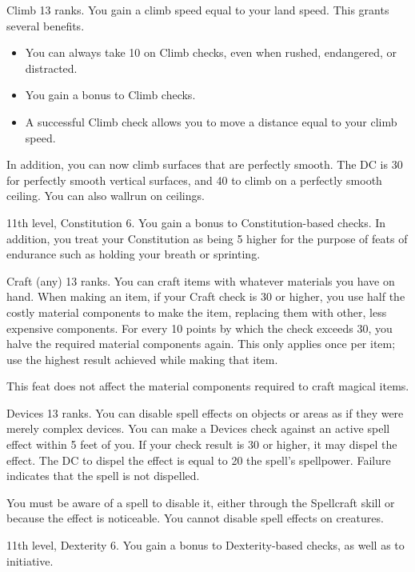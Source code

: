 \featpre Climb 13 ranks.
\featben You gain a climb speed equal to your land speed.
This grants several benefits.
\begin{itemize}
    \item You can always take 10 on Climb checks, even when rushed, endangered, or distracted.
    \item You gain a  bonus to Climb checks.
    \item A successful Climb check allows you to move a distance equal to your climb speed.
\end{itemize}

In addition, you can now climb surfaces that are perfectly smooth.
The DC is 30 for perfectly smooth vertical surfaces, and 40 to climb on a perfectly smooth ceiling.
You can also wallrun on ceilings.

\featpres 11th level, Constitution 6.
\featben You gain a  bonus to Constitution-based checks.
In addition, you treat your Constitution as being 5 higher for the purpose of feats of endurance such as holding your breath or sprinting.

\featpre Craft (any) 13 ranks.
\featben You can craft items with whatever materials you have on hand.
When making an item, if your Craft check is 30 or higher, you use half the costly material components to make the item, replacing them with other, less expensive components.
For every 10 points by which the check exceeds 30, you halve the required material components again.
This only applies once per item; use the highest result achieved while making that item.

This feat does not affect the material components required to craft magical items.

\featpre Devices 13 ranks.
\featben You can disable spell effects on objects or areas as if they were merely complex devices.
You can make a Devices check against an active spell effect within 5 feet of you.
If your check result is 30 or higher, it may dispel the effect.
The DC to dispel the effect is equal to 20 \add the spell's spellpower.
Failure indicates that the spell is not dispelled.

You must be aware of a spell to disable it, either through the Spellcraft skill or because the effect is noticeable.
You cannot disable spell effects on creatures.

\featpres 11th level, Dexterity 6.
\featben You gain a  bonus to Dexterity-based checks, as well as to initiative.

